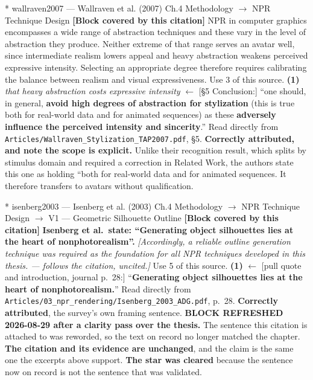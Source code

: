 \documentclass[11pt, a4paper]{article}
\makeatletter
\newcounter{citentry}
\newcommand{\citentry@core}[7]{%
  \stepcounter{citentry}
  \begingroup
  \sbox{\citentry@measurebox}{%
    \begin{minipage}{\linewidth}
      \noindent\colorbox{konstanzblue}{\parbox{\dimexpr\linewidth-2\fboxsep}{%
        \vspace{3pt}
        \textbf{\#\thecitentry \quad #2} \hfill \textit{#3}
        \vspace{3pt}
      }}
      \vspace{3pt}
      \noindent\begin{tabular}{@{}p{2.7cm} p{\dimexpr\linewidth-3cm}@{}}
        \textit{\small Sentence in thesis:} & #4 \\[5pt]
        \textbf{Usage:}\hfill       & #5 \\[5pt]
        \textit{\small Original source:}     & #6 \\[5pt]
        \textbf{How to check:}             & #7 \\
      \end{tabular}
      \vspace{5pt}
      \rule{10pt}{10pt}\quad \textbf{Validated} --- I have read the original and agree it supports the sentence.
    \end{minipage}%
  }%
  \Needspace{\dimexpr\ht\citentry@measurebox+\dp\citentry@measurebox\relax}%
  \endgroup
  \vspace{10pt}
  \noindent\colorbox{konstanzblue}{\parbox{\dimexpr\linewidth-2\fboxsep}{%
    \vspace{3pt}
    \textcolor{white}{\textbf{\#\thecitentry \quad #2}} \hfill \textcolor{white}{\textit{#3}}
    \vspace{3pt}
  }}
  \vspace{3pt}
  \noindent\begin{tabular}{@{}p{2.7cm} p{\dimexpr\linewidth-3cm}@{}}
    \textit{\small Sentence in thesis:} & \textcolor{darkgreen}{#4} \\[5pt]
    \textbf{Usage:}\hfill       & #5 \\[5pt]
    \textit{\small Original source:}     & \textcolor{darkred}{#6} \\[5pt]
    \textbf{How to check:}             & #7 \\
  \end{tabular}
  \vspace{5pt}
  \noindent\CheckBox[name=verified\thecitentry, width=10pt, height=10pt, bordercolor={0 0 0}, borderwidth=0.75, backgroundcolor={1 1 1}#1]{}\quad \textbf{Validated} --- I have read the original and agree it supports the sentence.
  \vspace{3pt}
  \noindent\textcolor{midgray}{\rule{\linewidth}{0.4pt}}
}
\newcommand{\citentry}{\@ifstar{\citentry@core{, checked}}{\citentry@core{}}}
\makeatother
\begin{document}
\begin{Form}
\citentry*
  {wallraven2007 --- Wallraven et al. (2007)}
  {Ch.4 Methodology $\rightarrow$ NPR Technique Design}
  {\textbf{[Block covered by this citation]} NPR in computer graphics encompasses a wide range of abstraction techniques and these vary in the level of abstraction they produce. Neither extreme of that range serves an avatar well, since intermediate realism lowers appeal and heavy abstraction weakens perceived expressive intensity. Selecting an appropriate degree therefore requires calibrating the balance between realism and visual expressiveness.}
  {Use 3 of this source.}
  {\textbf{(1)} \emph{that heavy abstraction costs expressive intensity} $\leftarrow$ [\S5 Conclusion:] ``one should, in general, \textbf{avoid high degrees of abstraction for stylization} (this is true both for real-world data and for animated sequences) as these \textbf{adversely influence the perceived intensity and sincerity}.''}
  {Read directly from \texttt{\footnotesize Articles/Wallraven\_Stylization\_TAP2007.pdf}, \S5. \textbf{Correctly attributed, and note the scope is explicit.} Unlike their recognition result, which splits by stimulus domain and required a correction in Related Work, the authors state this one as holding ``both for real-world data and for animated sequences. It therefore transfers to avatars without qualification.}

\citentry*
  {isenberg2003 --- Isenberg et al. (2003)}
  {Ch.4 Methodology $\rightarrow$ NPR Technique Design $\rightarrow$ V1 — Geometric Silhouette Outline}
  {\textbf{[Block covered by this citation]} \textbf{Isenberg et al.\ state: ``Generating object silhouettes lies at the heart of nonphotorealism''.} \emph{[Accordingly, a reliable outline generation technique was required as the foundation for all NPR techniques developed in this thesis. --- follows the citation, uncited.]}}
  {Use 5 of this source.}
  {\textbf{(1)} $\leftarrow$ [pull quote and introduction, journal p.~28:] ``\textbf{Generating object silhouettes lies at the heart of nonphotorealism.}''}
  {Read directly from \texttt{\footnotesize Articles/03\_npr\_rendering/Isenberg\_2003\_ADG.pdf}, p.~28. \textbf{Correctly attributed}, the survey's own framing sentence. \textbf{BLOCK REFRESHED 2026-08-29 after a clarity pass over the thesis.} The sentence this citation is attached to was reworded, so the text on record no longer matched the chapter. \textbf{The citation and its evidence are unchanged}, and the claim is the same one the excerpts above support. \textbf{The star was cleared} because the sentence now on record is not the sentence that was validated.}



\end{Form}
\end{document}
